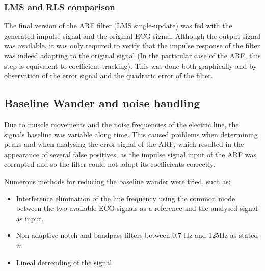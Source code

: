 \documentclass[conference]{IEEEtran}
\begin{document}
\subsubsection{LMS and RLS comparison} 

The final version of the ARF filter (LMS single-update) was fed with the generated impulse signal and the original ECG signal. Although the output signal was available, it was only required to verify that the impulse response of the filter was indeed adapting to the original signal (In the particular case of the ARF, this step is equivalent to coefficient tracking). This was done both graphically and by observation of the error signal and the quadratic error of the filter.\par

\subsection{Baseline Wander and noise handling}

Due to muscle movements and the noise frequencies of the electric line, the signals baseline was variable along time. This caused problems when determining peaks and when analysing the error signal of the ARF, which resulted in the appearance of several false positives, as the impulse signal input of the ARF was corrupted and so the filter could not adapt its coefficients correctly. \par
Numerous methods for reducing the baseline wander were tried, such as:
\begin{itemize}
\item Interference elimination of the line frequency using the common mode between the two available ECG signals as a reference and the analysed signal as input.
\item Non adaptive notch and bandpass filters between 0.7 Hz and 125Hz as stated in \cite{b2}
\item Lineal detrending of the signal.
\end{itemize}
\end{document}
